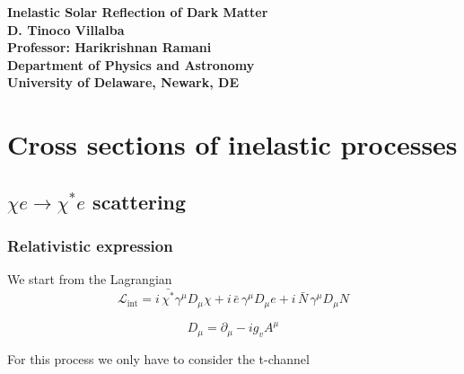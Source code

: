 \documentclass[13.1pt, letterpaper, twoside]{article}
\begin{document}
\thispagestyle{plain}

\begin{center}
	\textbf{\huge{Inelastic Solar Reflection of Dark Matter}}\\
	\vspace{6mm}
	\textbf{D. Tinoco Villalba}\\
	\vspace{3mm}
	\textbf{Professor: Harikrishnan Ramani}\\
	\vspace{6mm}
	\textbf{Department of Physics and Astronomy}\\
	\vspace{2mm}
	\textbf{University of Delaware, Newark, DE}\\
\end{center}

\section{Cross sections of inelastic processes}

\subsection{$\chi e \to \chi^\ast e$ scattering}

\subsubsection{Relativistic expression}

We start from the Lagrangian
\[
\mathcal{L}_{\text{int}}
= i\,\bar{\chi^\ast} \gamma^\mu D_\mu \chi
+ i\,\bar{e}\,\gamma^\mu D_\mu e
+ i\,\bar{N}\,\gamma^\mu D_\mu N
\]

\[
D_\mu=\partial_\mu-i g_v A^\mu
\]

For this process we only have to consider the t-channel 
\begin{center}
\end{center}
\end{document}
